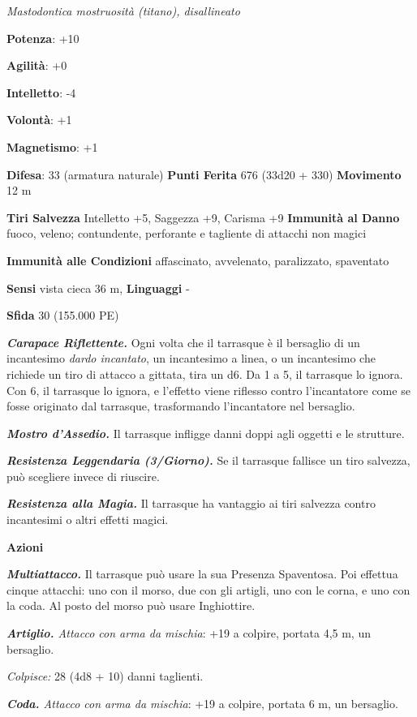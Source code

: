 \begin{multicols}{2}
\emph{Mastodontica mostruosità (titano), disallineato}

\textbf{Potenza}: +10

\textbf{Agilità}: +0

\textbf{Intelletto}: -4

\textbf{Volontà}: +1

\textbf{Magnetismo}: +1

\textbf{Difesa}: 33 (armatura naturale) \textbf{Punti Ferita}
676 (33d20 + 330) \textbf{Movimento} 12 m

\textbf{Tiri Salvezza} Intelletto +5, Saggezza +9, Carisma +9
\textbf{Immunità al Danno} fuoco, veleno; contundente, perforante e
tagliente di attacchi non magici

\textbf{Immunità alle Condizioni} affascinato, avvelenato, paralizzato,
spaventato

\textbf{Sensi} vista cieca 36 m, 
\textbf{Linguaggi} -

\textbf{Sfida} 30 (155.000 PE)

\emph{\textbf{Carapace Riflettente.}} Ogni volta che il tarrasque è il
bersaglio di un incantesimo \emph{dardo incantato}, un incantesimo a
linea, o un incantesimo che richiede un tiro di attacco a gittata, tira
un d6. Da 1 a 5, il tarrasque lo ignora. Con 6, il tarrasque lo ignora,
e l'effetto viene riflesso contro l'incantatore come se fosse originato
dal tarrasque, trasformando l'incantatore nel bersaglio.

\emph{\textbf{Mostro d'Assedio.}} Il tarrasque infligge danni doppi agli
oggetti e le strutture.

\emph{\textbf{Resistenza Leggendaria (3/Giorno).}} Se il tarrasque
fallisce un tiro salvezza, può scegliere invece di riuscire.

\emph{\textbf{Resistenza alla Magia.}} Il tarrasque ha vantaggio ai tiri
salvezza contro incantesimi o altri effetti magici.


\textbf{Azioni}

\emph{\textbf{Multiattacco.}} Il tarrasque può usare la sua Presenza
Spaventosa. Poi effettua cinque attacchi: uno con il morso, due con gli
artigli, uno con le corna, e uno con la coda. Al posto del morso può
usare Inghiottire.

\emph{\textbf{Artiglio.} Attacco con arma da mischia}: +19 a colpire,
portata 4,5 m, un bersaglio.

\emph{Colpisce:} 28 (4d8 + 10) danni taglienti.

\emph{\textbf{Coda.} Attacco con arma da mischia}: +19 a colpire,
portata 6 m, un bersaglio.


\end{multicols}
